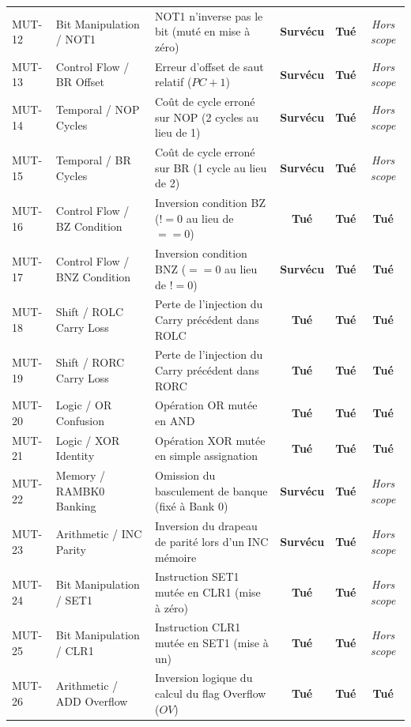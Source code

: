 \documentclass[10pt,journal,compsoc]{IEEEtran}
\begin{document}
\begin{table}[t]
\begin{tabularx}{\textwidth}{l p{3.8cm} X ccc}
MUT-12 & Bit Manipulation / NOT1 & NOT1 n'inverse pas le bit (muté en mise à zéro) & \textbf{Survécu} & \textbf{Tué} & \textit{Hors scope} \\
MUT-13 & Control Flow / BR Offset & Erreur d'offset de saut relatif ($PC + 1$) & \textbf{Survécu} & \textbf{Tué} & \textit{Hors scope} \\
MUT-14 & Temporal / NOP Cycles & Coût de cycle erroné sur NOP (2 cycles au lieu de 1) & \textbf{Survécu} & \textbf{Tué} & \textit{Hors scope} \\
MUT-15 & Temporal / BR Cycles & Coût de cycle erroné sur BR (1 cycle au lieu de 2) & \textbf{Survécu} & \textbf{Tué} & \textit{Hors scope} \\
MUT-16 & Control Flow / BZ Condition & Inversion condition BZ ($!= 0$ au lieu de $== 0$) & \textbf{Tué} & \textbf{Tué} & \textbf{Tué} \\
MUT-17 & Control Flow / BNZ Condition & Inversion condition BNZ ($== 0$ au lieu de $!= 0$) & \textbf{Survécu} & \textbf{Tué} & \textbf{Tué} \\
MUT-18 & Shift / ROLC Carry Loss & Perte de l'injection du Carry précédent dans ROLC & \textbf{Tué} & \textbf{Tué} & \textbf{Tué} \\
MUT-19 & Shift / RORC Carry Loss & Perte de l'injection du Carry précédent dans RORC & \textbf{Tué} & \textbf{Tué} & \textbf{Tué} \\
MUT-20 & Logic / OR Confusion & Opération OR mutée en AND & \textbf{Tué} & \textbf{Tué} & \textbf{Tué} \\
MUT-21 & Logic / XOR Identity & Opération XOR mutée en simple assignation & \textbf{Tué} & \textbf{Tué} & \textbf{Tué} \\
MUT-22 & Memory / RAMBK0 Banking & Omission du basculement de banque (fixé à Bank 0) & \textbf{Survécu} & \textbf{Tué} & \textit{Hors scope} \\
MUT-23 & Arithmetic / INC Parity & Inversion du drapeau de parité lors d'un INC mémoire & \textbf{Survécu} & \textbf{Tué} & \textit{Hors scope} \\
MUT-24 & Bit Manipulation / SET1 & Instruction SET1 mutée en CLR1 (mise à zéro) & \textbf{Tué} & \textbf{Tué} & \textit{Hors scope} \\
MUT-25 & Bit Manipulation / CLR1 & Instruction CLR1 mutée en SET1 (mise à un) & \textbf{Tué} & \textbf{Tué} & \textit{Hors scope} \\
MUT-26 & Arithmetic / ADD Overflow & Inversion logique du calcul du flag Overflow ($OV$) & \textbf{Tué} & \textbf{Tué} & \textbf{Tué} \\
\bottomrule
\end{tabularx}
\end{table}
\end{document}
